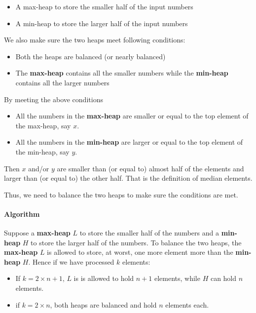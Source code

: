 \begin{itemize}
\item A max-heap to store the smaller half of the input numbers
\item A min-heap to store the larger half of the input numbers
\end{itemize}

We also make sure the two heaps meet following conditions:

\begin{itemize}
\item Both the heaps are balanced (or nearly balanced)
\item The \textbf{max-heap} contains all the smaller numbers while the \textbf{min-heap} contains all the larger numbers
\end{itemize}

By meeting the above conditions
\begin{itemize}
\item All the numbers in the \textbf{max-heap} are smaller or equal to the top element of the max-heap, say $x$.
\item All the numbers in the \textbf{min-heap} are larger or equal to the top element of the min-heap, say $y$.
\end{itemize}

Then $x$ and/or $y$ are smaller than (or equal to) almost half of the elements and larger than (or equal to) the other half. That is the definition of median elements. 

Thus, we need to balance the two heaps to make sure the conditions are met.

\paragraph{Algorithm}

Suppose a \textbf{max-heap} $L$ to store the smaller half of the numbers and a \textbf{min-heap} $H$ to store the larger half of the numbers. To balance the two heaps, the \textbf{max-heap} $L$ is allowed to store, at worst, one more element more than the \textbf{min-heap} $H$. Hence if we have processed $k$ elements:

\begin{itemize}
\item If $k=2\times n+1$, $L$ is is allowed to hold $n+1$ elements, while $H$ can hold $n$ elements.
\item if $k=2\times n$, both heaps are balanced and hold $n$ elements each.
\end{itemize}

